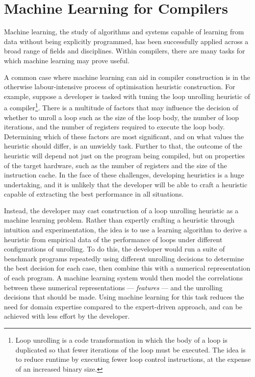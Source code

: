 \section{Machine Learning for Compilers}

Machine learning, the study of algorithms and systems capable of learning from data without being explicitly programmed, has been successfully applied across a broad range of fields and disciplines. Within compilers, there are many tasks for which machine learning may prove useful.

A common case where machine learning can aid in compiler construction is in the otherwise labour-intensive process of optimisation heuristic construction. For example, suppose a developer is tasked with tuning the loop unrolling heuristic of a compiler\footnote{Loop unrolling is a code transformation in which the body of a loop is duplicated so that fewer iterations of the loop must be executed. The idea is to reduce runtime by executing fewer loop control instructions, at the expense of an increased binary size.}. There is a multitude of factors that may influence the decision of whether to unroll a loop such as the size of the loop body, the number of loop iterations, and the number of registers required to execute the loop body. Determining which of these factors are most significant, and on what values the heuristic should differ, is an unwieldy task. Further to that, the outcome of the heuristic will depend not just on the program being compiled, but on properties of the target hardware, such as the number of registers and the size of the instruction cache. In the face of these challenges, developing heuristics is a huge undertaking, and it is unlikely that the developer will be able to craft a heuristic capable of extracting the best performance in all situations.

Instead, the developer may cast construction of a loop unrolling heuristic as a machine learning problem. Rather than expertly crafting a heuristic through intuition and experimentation, the idea is to use a learning algorithm to derive a heuristic from empirical data of the performance of loops under different configurations of unrolling. To do this, the developer would run a suite of benchmark programs repeatedly using different unrolling decisions to determine the best decision for each case, then combine this with a numerical representation of each program. A machine learning system would then model the correlations between these numerical representations --- \emph{features} --- and the unrolling decisions that should be made. Using machine learning for this task reduces the need for domain expertise compared to the expert-driven approach, and can be achieved with less effort by the developer.

